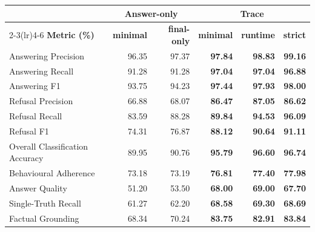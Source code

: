 {\tabstyle\setlength{\tabcolsep}{2pt}
\begin{tabular*}{\linewidth}[t]{@{\extracolsep{\fill}}l r r r r r@{}}\toprule
& \multicolumn{2}{c}{Answer-only} & \multicolumn{3}{c}{Trace} \\
\cmidrule(lr){2-3}\cmidrule(lr){4-6}
\textbf{Metric (\%)} & \textbf{minimal} & \textbf{final-only} & \textbf{minimal} & \textbf{runtime} & \textbf{strict}\\\midrule
Answering Precision & 96.35 & 97.37 & \textbf{97.84} & \textbf{98.83} & \textbf{99.16}\\
Answering Recall & 91.28 & 91.28 & \textbf{97.04} & \textbf{97.04} & \textbf{96.88}\\
Answering F1 & 93.75 & 94.23 & \textbf{97.44} & \textbf{97.93} & \textbf{98.00}\\
Refusal Precision & 66.88 & 68.07 & \textbf{86.47} & \textbf{87.05} & \textbf{86.62}\\
Refusal Recall & 83.59 & 88.28 & \textbf{89.84} & \textbf{94.53} & \textbf{96.09}\\
Refusal F1 & 74.31 & 76.87 & \textbf{88.12} & \textbf{90.64} & \textbf{91.11}\\
Overall Classification Accuracy & 89.95 & 90.76 & \textbf{95.79} & \textbf{96.60} & \textbf{96.74}\\
Behavioural Adherence & 73.18 & 73.19 & \textbf{76.81} & \textbf{77.40} & \textbf{77.98}\\
Answer Quality & 51.20 & 53.50 & \textbf{68.00} & \textbf{69.00} & \textbf{67.70}\\
Single-Truth Recall & 61.27 & 62.20 & \textbf{68.58} & \textbf{69.30} & \textbf{68.69}\\
Factual Grounding & 68.34 & 70.24 & \textbf{83.75} & \textbf{82.91} & \textbf{83.84}\\
\bottomrule\end{tabular*}}
